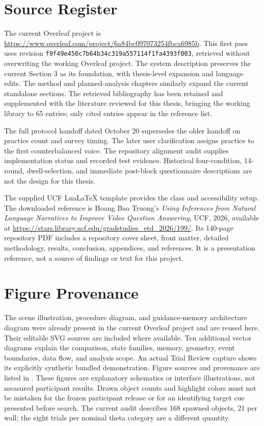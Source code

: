 \section{Source Register}
The current Overleaf project is \url{https://www.overleaf.com/project/6a84bc097073254fbca6985b}. This first pass uses revision \texttt{f9f49e450c7b64b34c319a557114f1fa4393f003}, retrieved without overwriting the working Overleaf project. The system description preserves the current Section 3 as its foundation, with thesis-level expansion and language edits. The method and planned-analysis chapters similarly expand the current standalone sections. The retrieved bibliography has been retained and supplemented with the literature reviewed for this thesis, bringing the working library to 65 entries; only cited entries appear in the reference list.

The full protocol handoff dated October 20 supersedes the older handoff on practice count and survey timing. The later user clarification assigns practice to the first counterbalanced voice. The repository alignment audit supplies implementation status and recorded test evidence. Historical four-condition, 14-round, dwell-selection, and immediate post-block questionnaire descriptions are not the design for this thesis.

The supplied UCF LuaLaTeX template provides the class and accessibility setup. The downloaded reference is Hoang Bao Truong's \emph{Using Inferences from Natural Language Narratives to Improve Video Question Answering}, UCF, 2026, available at \url{https://stars.library.ucf.edu/gradstudies_etd_2026/199/}. Its 140-page repository PDF includes a repository cover sheet, front matter, detailed methodology, results, conclusion, appendices, and references. It is a presentation reference, not a source of findings or text for this project.

\section{Figure Provenance}
The scene illustration, procedure diagram, and guidance-memory architecture diagram were already present in the current Overleaf project and are reused here. Their editable SVG sources are included where available. Ten additional vector diagrams explain the comparison, state families, memory, geometry, event boundaries, data flow, and analysis scope. An actual Trial Review capture shows its explicitly synthetic bundled demonstration. Figure sources and provenance are listed in . These figures are explanatory schematics or interface illustrations, not measured participant results. Drawn object counts and highlight colors must not be mistaken for the frozen participant release or for an identifying target cue presented before search. The current audit describes 168 spawned objects, 21 per wall; the eight trials per nominal theta category are a different quantity.

